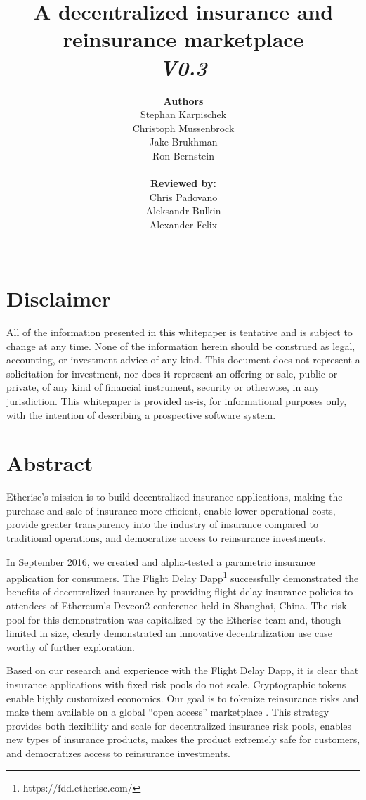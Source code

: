 \documentclass[12pt]{article}
\title{A decentralized insurance and reinsurance marketplace\\\vspace{5mm}\small\textit{V0.3}\vspace{20mm}}
\author{\textbf{Authors}\\Stephan Karpischek\\Christoph Mussenbrock\\Jake Brukhman\\Ron Bernstein\\\\\textbf{Reviewed by:}\\Chris Padovano\\Aleksandr Bulkin\\Alexander Felix\\\\}
\date
\begin{document}
%
%
\maketitle
\newpage

%
%
\renewcommand{\cftsecleader}{\cftdotfill{\cftdotsep}}
\tableofcontents
\newpage

%
%
\section{Disclaimer}

All of the information presented in this whitepaper is tentative and is subject to change at any time. None of the information herein should be construed as legal, accounting, or investment advice of any kind. This document does not represent a solicitation for investment, nor does it represent an offering or sale, public or private, of any kind of financial instrument, security or otherwise, in any jurisdiction. This whitepaper is provided as-is, for informational purposes only, with the intention of describing a prospective software system.

\newpage

\section{Abstract}

Etherisc's mission is to build decentralized insurance applications, making the purchase and sale of insurance more efficient, enable lower operational costs, provide greater transparency into the industry of insurance compared to traditional operations, and democratize access to reinsurance investments.  

In September 2016, we created and alpha-tested a parametric insurance application for consumers. The Flight Delay Dapp\footnote{https://fdd.etherisc.com/} successfully demonstrated the benefits of decentralized insurance by providing flight delay insurance policies to attendees of Ethereum's Devcon2 conference held in Shanghai, China. The risk pool for this demonstration was capitalized by the Etherisc team and, though limited in size, clearly demonstrated an innovative decentralization use case worthy of further exploration.

Based on our research and experience with the Flight Delay Dapp, it is clear that insurance applications with fixed risk pools do not scale. Cryptographic tokens enable highly customized economics. Our goal is to tokenize reinsurance risks and make them available on a global “open access” marketplace . This strategy provides both flexibility and scale for decentralized insurance risk pools, enables new types of insurance products, makes the product extremely safe for customers, and democratizes access to reinsurance investments.
\end{document}
